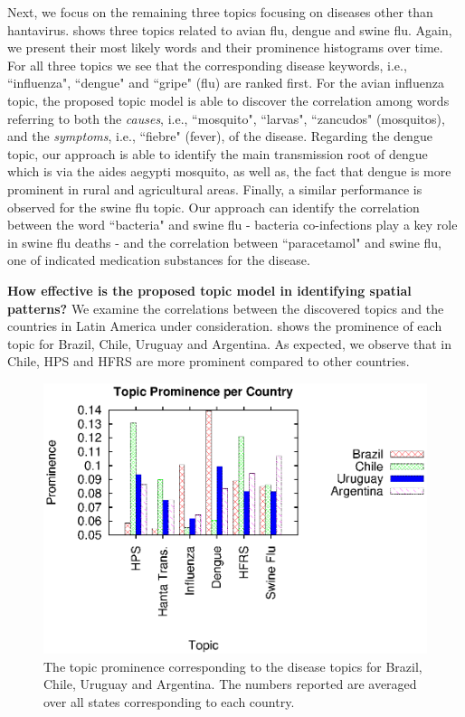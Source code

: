 \documentclass[conference]{IEEEtran}
\begin{document}
Next, we focus on the remaining three topics focusing on diseases other than hantavirus.  shows three topics related to avian flu, dengue and swine flu. Again, we present their most likely words and their prominence histograms over time. For all three topics we see that the corresponding disease keywords, i.e., ``influenza",  ``dengue" and ``gripe" (flu) are ranked first. For the avian influenza topic, the proposed topic model is able to discover the correlation among words referring to both the {\em causes}, i.e., ``mosquito", ``larvas", ``zancudos" (mosquitos), and the {\em symptoms}, i.e., ``fiebre" (fever), of the disease. Regarding the dengue topic, our approach is able to identify the main transmission root of dengue which is via the aides aegypti mosquito, as well as, the fact that dengue is more prominent in rural and agricultural areas. Finally, a similar performance is observed for the swine flu topic. Our approach can identify the correlation between the word ``bacteria" and swine flu - bacteria co-infections play a key role in swine flu deaths - and the correlation between ``paracetamol" and swine flu, one of indicated medication substances for the disease.

\vspace{2pt}\noindent\textbf{How effective is the proposed topic model in identifying spatial patterns?}  We examine the correlations between the discovered topics and the countries in Latin America under consideration.  shows the prominence of each topic for Brazil, Chile, Uruguay and Argentina. As expected, we observe that in Chile, HPS and HFRS are more prominent compared to other countries.

\begin{figure}[h]
\begin{center}
	\includegraphics[trim=5 0 10 5, clip,scale=0.6]{fig/country_topic.eps}
\end{center}
\caption{The topic prominence corresponding to the disease topics for Brazil, Chile, Uruguay and Argentina. The numbers reported are averaged over all states corresponding to each country.}
 \label{fig:country_topic}
 \vspace{-10pt}
\end{figure}
\end{document}
